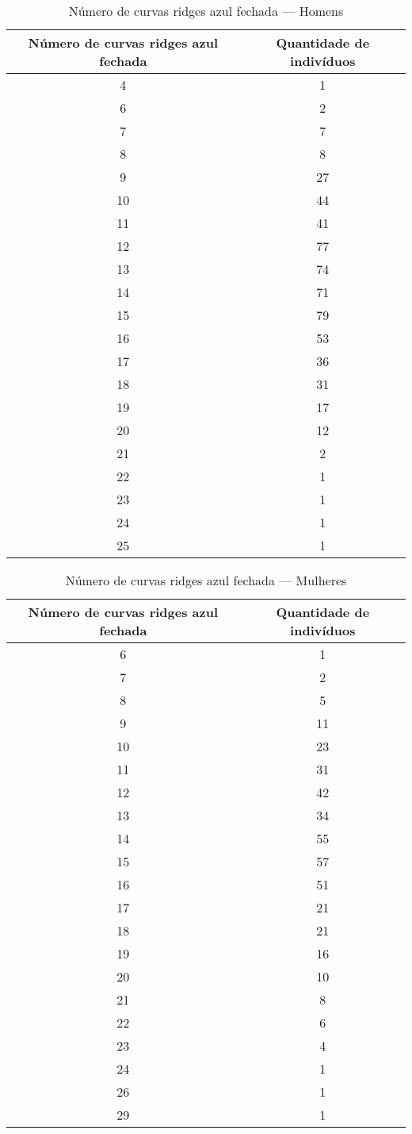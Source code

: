 \documentclass[a4paper,12pt]{article}
\begin{document}
\begin{table}[h!]
\centering
\caption{Número de curvas ridges azul fechada — Homens}
\begin{tabular}{c c}
\hline
\textbf{Número de curvas ridges azul fechada} & \textbf{Quantidade de indivíduos} \\ 
\hline
4  & 1  \\
6  & 2  \\
7  & 7  \\
8  & 8  \\
9  & 27 \\
10 & 44 \\
11 & 41 \\
12 & 77 \\
13 & 74 \\
14 & 71 \\
15 & 79 \\
16 & 53 \\
17 & 36 \\
18 & 31 \\
19 & 17 \\
20 & 12 \\
21 & 2  \\
22 & 1  \\
23 & 1  \\
24 & 1  \\
25 & 1  \\
\hline
\end{tabular}
\end{table}


\begin{table}[h!]
\centering
\caption{Número de curvas ridges azul fechada — Mulheres}
\begin{tabular}{c c}
\hline
\textbf{Número de curvas ridges azul fechada} & \textbf{Quantidade de indivíduos} \\ 
\hline
6  & 1  \\
7  & 2  \\
8  & 5  \\
9  & 11 \\
10 & 23 \\
11 & 31 \\
12 & 42 \\
13 & 34 \\
14 & 55 \\
15 & 57 \\
16 & 51 \\
17 & 21 \\
18 & 21 \\
19 & 16 \\
20 & 10 \\
21 & 8  \\
22 & 6  \\
23 & 4  \\
24 & 1  \\
26 & 1  \\
29 & 1  \\
\hline
\end{tabular}
\end{table}
\end{document}
